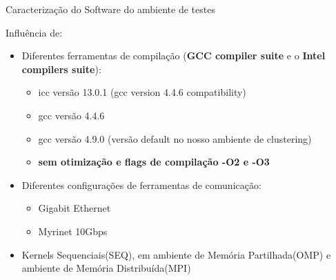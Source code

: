 \documentclass{beamer}
\begin{document}
  \begin{frame}{Caracterização do Software do ambiente de testes}

Influência de:
\begin{itemize}

\item Diferentes ferramentas de compilação (\textbf{GCC compiler suite}	e o \textbf{ Intel compilers suite}):
\begin{itemize}
\item icc versão 13.0.1 (gcc version 4.4.6 compatibility)
\item gcc versão 4.4.6
\item gcc versão  4.9.0  (versão default no nosso ambiente de clustering)
\item \textbf{sem otimização e flags de compilação -O2 e -O3 }
 \end{itemize}
 \item Diferentes configurações de ferramentas de comunicação:
 \begin{itemize}
\item Gigabit Ethernet
\item Myrinet 10Gbps
 \end{itemize}
 \item Kernels Sequenciais(SEQ), em ambiente de Memória Partilhada(OMP) e ambiente de Memória Distribuída(MPI)

 \end{itemize}


  \end{frame}
  
\end{document}
